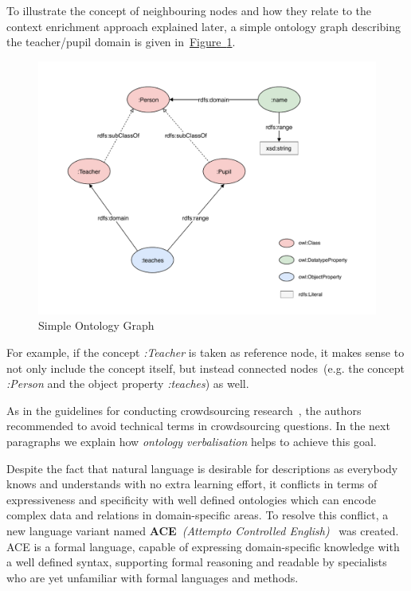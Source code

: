 \documentclass[draft,final]{vutinfth} %
\begin{document}
To illustrate the concept of neighbouring nodes and how they relate to the context enrichment approach explained later, a simple ontology graph describing the teacher/pupil domain is given in~\hyperref[fig:simple_owl_graph]{Figure~\ref*{fig:simple_owl_graph}}.
\begin{figure}
	 \centering
	 \includegraphics[width=\textwidth]{drawio/University_Ontology_Example}
	 \caption{Simple Ontology Graph}\label{fig:simple_owl_graph}
\end{figure}
For example, if the concept \textit{:Teacher} is taken as reference node, it makes sense to not only include the concept itself, but instead connected nodes~(e.g. the concept \textit{:Person} and the object property \textit{:teaches}) as well. 

As in the guidelines for conducting crowdsourcing research~\cite{sarasua2015crowdsourcing}, the authors recommended to avoid technical terms in crowdsourcing questions. In the next paragraphs we explain how \textit{ontology verbalisation} helps to achieve this goal. 

Despite the fact that natural language is desirable for descriptions as everybody knows and understands with no extra learning effort, it conflicts in terms of expressiveness and specificity with well defined ontologies which can encode complex data and relations in domain-specific areas. To resolve this conflict, a new language variant named \textbf{ACE}~\textit{(Attempto Controlled English)}~\cite{fuchs2008} was created. ACE is a formal language, capable of expressing domain-specific knowledge with a well defined syntax, supporting formal reasoning and readable by specialists who are yet unfamiliar with formal languages and methods.
\end{document}
